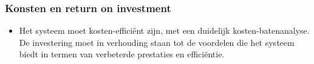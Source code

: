 \subsubsection{Konsten en return on investment}
\begin{itemize}
  \item Het systeem moet kosten-efficiënt zijn, met een duidelijk kosten-batenanalyse. De investering moet in verhouding staan tot de voordelen die het systeem biedt in termen van verbeterde prestaties en efficiëntie.
\end{itemize}
